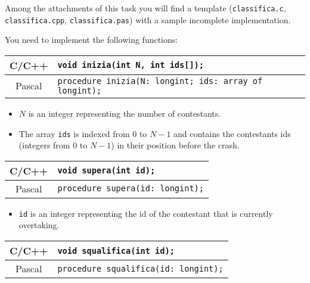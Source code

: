 \begin{warning}
Among the attachments of this task you will find a template (\texttt{classifica.c}, \texttt{classifica.cpp}, \texttt{classifica.pas}) with a sample incomplete implementation.
\end{warning}

You need to implement the following functions:

\begin{center}\begin{tabularx}{\textwidth}{|c|X|}
\hline
C/C++  & \verb|void inizia(int N, int ids[]);|\\
\hline
Pascal  & \verb|procedure inizia(N: longint; ids: array of longint);|\\
\hline
\end{tabularx}\end{center}

\begin{itemize}[nolistsep]
  \item $N$ is an integer representing the number of contestants.
  \item The array \texttt{ids} is indexed from $0$ to $N-1$ and contains the contestants ids (integers from $0$ to $N-1$) in their position before the crash.
\end{itemize}

\medskip

\begin{center}\begin{tabularx}{\textwidth}{|c|X|}
\hline
C/C++  & \verb|void supera(int id);|\\
\hline
Pascal  & \verb|procedure supera(id: longint);|\\
\hline
\end{tabularx}\end{center}

\begin{itemize}[nolistsep]
  \item \texttt{id} is an integer representing the id of the contestant that is currently overtaking.
\end{itemize}

\medskip

\begin{center}\begin{tabularx}{\textwidth}{|c|X|}
\hline
C/C++  & \verb|void squalifica(int id);|\\
\hline
Pascal  & \verb|procedure squalifica(id: longint);|\\
\hline
\end{tabularx}\end{center}

